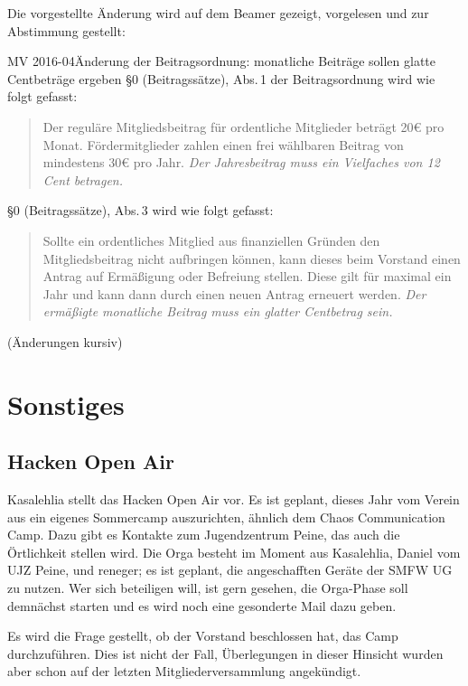 \documentclass[parskip=half-]{s0minutes}
\begin{document}
Die vorgestellte Änderung wird auf dem Beamer gezeigt, vorgelesen und zur
Abstimmung gestellt:

\begin{resolution}{MV 2016-04}{}{Änderung der
	Beitragsordnung: monatliche Beiträge sollen glatte Cent\-beträge ergeben}{}
	§0 (Beitragssätze), Abs.\,1 der Beitragsordnung wird wie folgt gefasst:
	\begin{quote}
		Der reguläre Mitgliedsbeitrag für ordentliche Mitglieder beträgt 20€ pro
		Monat. Fördermitglieder zahlen einen frei wählbaren Beitrag von mindestens
		30€ pro Jahr. \emph{Der Jahresbeitrag muss ein Vielfaches von 12 Cent
		betragen.}
	\end{quote}

	§0 (Beitragssätze), Abs.\,3 wird wie folgt gefasst:
	\begin{quote}
		Sollte ein ordentliches Mitglied aus finanziellen Gründen den
		Mitgliedsbeitrag nicht aufbringen können, kann dieses beim Vorstand einen
		Antrag auf Ermäßigung oder Befreiung stellen. Diese gilt für maximal ein
		Jahr und kann dann durch einen neuen Antrag erneuert werden. \emph{Der
		ermäßigte monatliche Beitrag muss ein glatter Centbetrag sein.}
	\end{quote}

	(Änderungen kursiv)
\end{resolution}

\section{Sonstiges}

\subsection{Hacken Open Air}\label{sec:hackenopenair}
Kasalehlia stellt das Hacken Open Air vor. Es ist geplant, dieses Jahr vom
Verein aus ein eigenes Sommercamp auszurichten, ähnlich dem Chaos Communication
Camp. Dazu gibt es Kontakte zum Jugendzentrum Peine, das auch die Örtlichkeit
stellen wird. Die Orga besteht im Moment aus Kasalehlia, Daniel vom
UJZ Peine, und reneger; es ist geplant, die angeschafften Geräte der
SMFW UG zu nutzen. Wer sich beteiligen will, ist gern gesehen, die Orga-Phase
soll demnächst starten und es wird noch eine gesonderte Mail dazu geben.

Es wird die Frage gestellt, ob der Vorstand beschlossen hat, das Camp
durchzuführen. Dies ist nicht der Fall, Überlegungen in dieser Hinsicht wurden
aber schon auf der letzten Mitgliederversammlung angekündigt.
\end{document}
